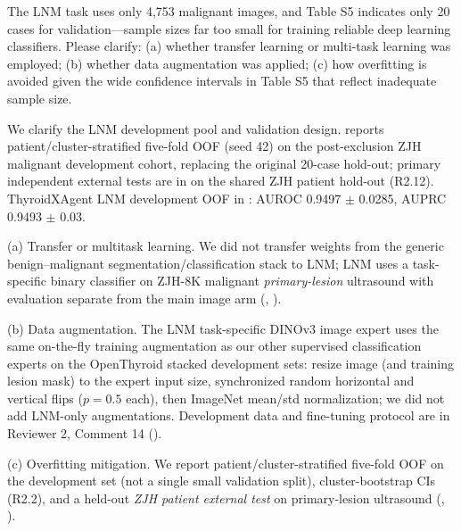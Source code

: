 \begin{reviewercomment}
The LNM task uses only 4,753 malignant images, and Table S5 indicates only 20 cases for validation---sample sizes far too small for training reliable deep learning classifiers. Please clarify: (a) whether transfer learning or multi-task learning was employed; (b) whether data augmentation was applied; (c) how overfitting is avoided given the wide confidence intervals in Table S5 that reflect inadequate sample size.
\end{reviewercomment}
\begin{authorresponse}
We clarify the LNM development pool and validation design.  reports patient/cluster-stratified five-fold OOF (seed 42) on the post-exclusion ZJH malignant development cohort, replacing the original 20-case hold-out; primary independent external tests are in  on the shared ZJH patient hold-out (R2.12). ThyroidXAgent LNM development OOF in : AUROC 0.9497 $\pm$ 0.0285, AUPRC 0.9493 $\pm$ 0.03.\par
(a) Transfer or multitask learning. We did not transfer weights from the generic benign--malignant segmentation/classification stack to LNM; LNM uses a task-specific binary classifier on ZJH-8K malignant \emph{primary-lesion} ultrasound with evaluation separate from the main image arm (, ).\par
(b) Data augmentation. The LNM task-specific DINOv3 image expert uses the same on-the-fly training augmentation as our other supervised classification experts on the OpenThyroid stacked development sets: resize image (and training lesion mask) to the expert input size, synchronized random horizontal and vertical flips ($p{=}0.5$ each), then ImageNet mean/std normalization; we did not add LNM-only augmentations. Development data and fine-tuning protocol are in Reviewer 2, Comment 14 ().\par
(c) Overfitting mitigation. We report patient/cluster-stratified five-fold OOF on the development set (not a single small validation split), cluster-bootstrap CIs (R2.2), and a held-out \emph{ZJH patient external test} on primary-lesion ultrasound (, ).\par
\par
\end{authorresponse}

